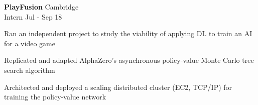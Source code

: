 \documentclass[letterpaper, 10pt]{article}
\begin{document}
\vspace{.5\baselineskip}
\textbf{PlayFusion} \hfill Cambridge\\
Intern \hfill Jul - Sep 18
\begin{compact}
	\item Ran an independent project to study the viability of applying DL to train an AI for a video game
	\item Replicated and adapted AlphaZero's asynchronous policy-value Monte Carlo tree search algorithm
	\item Architected and deployed a scaling distributed cluster (EC2, TCP/IP) for training the policy-value network
\end{compact}
\end{document}
